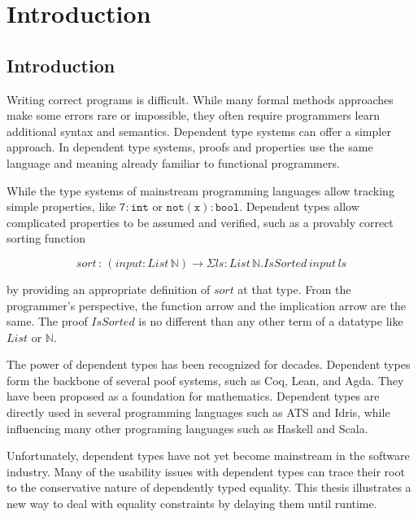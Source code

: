 \chapter{Introduction}
\label{chapter:Introduction}
\thispagestyle{myheadings}

\section{Introduction} %

Writing correct programs is difficult.
While many formal methods approaches make some errors rare or impossible, they often require programmers learn additional syntax and semantics.
Dependent type systems can offer a simpler approach.
In dependent type systems, proofs and properties use the same language and meaning already familiar to functional programmers.

While the type systems of mainstream programming languages allow tracking simple properties, like $\mathtt{7:int}$ or $\mathtt{not(x):bool}$.
Dependent types allow complicated properties to be assumed and verified, such as a provably correct sorting function

\[
sort\,:\,\left(input:List\,\mathbb{N}\right)\rightarrow\Sigma ls:List\,\mathbb{N}.IsSorted\,input\,ls
\]

by providing an appropriate definition of $sort$ at that type.
From the programmer's perspective, the function arrow and the implication arrow are the same.
The proof $IsSorted$ is no different than any other term of a datatype like $List$ or $\mathbb{N}$.

The power of dependent types has been recognized for decades.
Dependent types form the backbone of several poof systems, such as Coq\cite{Coq12}, Lean\cite{10.1007/978-3-030-79876-5_37}, and Agda\cite{norell2007towards}.
They have been proposed as a foundation for mathematics\cite{Martin-Lof-1972,HoTTbook}.
Dependent types are directly used in several programming languages such as ATS\cite{DependentMLAnapproachtopracticalprogrammingwithdependenttypes} and Idris\cite{brady2013idris}, while influencing many other programing languages such as Haskell and Scala.

Unfortunately, dependent types have not yet become mainstream in the software industry.
Many of the usability issues with dependent types can trace their root to the conservative nature of dependently typed equality.
This thesis illustrates a new way to deal with equality constraints by delaying them until runtime.

